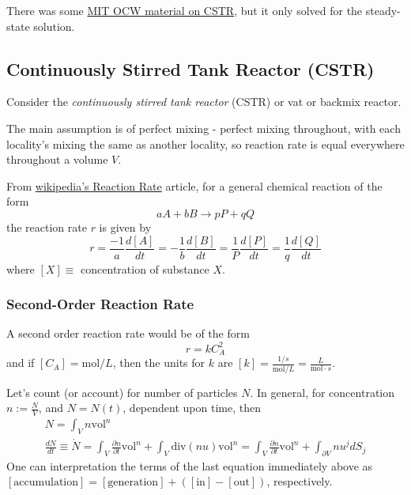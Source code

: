 \documentclass[10pt]{amsart}
\begin{document}
\begin{multicols*}{2}
There was some \href{http://ocw.mit.edu/courses/chemical-engineering/10-37-chemical-and-biological-reaction-engineering-spring-2007/lecture-notes/lec05_02212007_g.pdf}{MIT OCW material on CSTR}, but it only solved for the steady-state solution.  

\subsection{Continuously Stirred Tank Reactor (CSTR)}

Consider the \emph{continuously stirred tank reactor} (CSTR) or vat or backmix reactor.  

The main assumption is of perfect mixing - perfect mixing throughout, with each locality's mixing the same as another locality, so reaction rate is equal everywhere throughout a volume $V$.  

From \href{https://en.wikipedia.org/wiki/Reaction_rate}{wikipedia's Reaction Rate} article, for a general chemical reaction of the form
\[
aA + bB \to pP + qQ
\]
the reaction rate $r$ is given by 
\[
r = \frac{-1}{a} \frac{d[A]}{dt} = - \frac{1}{b} \frac{d[B]}{dt} = \frac{1}{P} \frac{d[P]}{dt} = \frac{1}{q} \frac{d[Q]}{dt}
\]
where $[X] \equiv $ concentration of substance $X$.  

\subsubsection{Second-Order Reaction Rate}

A second order reaction rate would be of the form
\[
r = kC_A^2
\]
and if $[C_A] = \text{mol}/L$, then the units for $k$ are $[k] = \frac{ 1/s}{ \text{mol}/L} = \frac{L}{ \text{mol}\cdot s}$.  


Let's count (or account) for number of particles $N$.  In general, for concentration $n:= \frac{N}{V}$, and $N=N(t)$, dependent upon time, then
\[
\begin{gathered}
  N = \int_V n \text{vol}^n  \\
  \frac{dN}{dt} \equiv \dot{N} = \int_V \frac{ \partial n}{ \partial t} \text{vol}^n + \int_V \text{div}(nu) \text{vol}^n = \int_V \frac{ \partial n}{ \partial t} \text{vol}^n + \int_{\partial V} nu^j dS_j 
\end{gathered}
\]
One can interpretation the terms of the last equation immediately above as $[\text{accumulation}] = [\text{generation}] + ([\text{in}] - [\text{out}])$, respectively.  


\end{multicols*}
\end{document}
